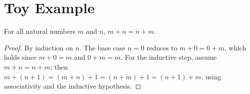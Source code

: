 \section{Toy Example}

\begin{theorem}
For all natural numbers $m$ and $n$, $m + n = n + m$.
\end{theorem}

\begin{proof}
By induction on $n$. The base case $n = 0$ reduces to $m + 0 = 0 + m$, which
holds since $m + 0 = m$ and $0 + m = m$. For the inductive step, assume
$m + n = n + m$; then $m + (n+1) = (m+n) + 1 = (n+m) + 1 = (n+1) + m$, using
associativity and the inductive hypothesis.
\end{proof}

